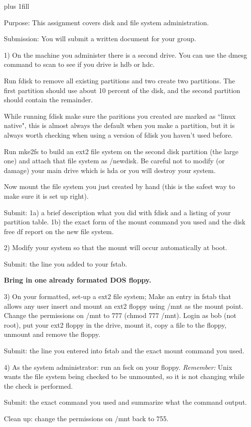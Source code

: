 
\rightskip=0pt plus 1fill

\parindent 0pt

Purpose: This assignment covers disk and file system administration.

Submission: You will submit a written document for your group.

1) On the machine you administer there is a second drive.
You can use the {\ltt{}dmesg} command to scan to see
if you drive is {\ltt{}hdb} or {\ltt{}hdc}.

Run {\ltt{}fdisk} to remove all existing partitions and two create
two partitions.
The first partition should use about 10 percent of the
disk, and the second partition should contain the remainder.

While running {\ltt{}fdisk} make sure the paritions
you created are marked as ``linux native", this is almost always the
default when you make a partition, but it is always worth checking
when using a version of {\ltt{}fdisk} you haven't used before.

Run {\ltt{}mke2fs} to build 
an ext2 file system on the second disk partition (the large
one) and attach that file system as {\ltt{}/newdisk}.
Be careful not to modify (or damage) your main drive
which is {\ltt{}hda} or you will destroy your system.

Now mount the file system you just created by hand
(this is the safest way to make sure it is set up right).

Submit: 
1a) a brief description what you did with {\ltt{}fdisk} and
a listing of your partition table.
1b) the exact form of the {\ltt{}mount} command you used and
the disk free {\ltt{}df} report on the new file system.

2) Modify your system so that the mount will 
occur automatically at boot.

Submit: the line you added to your {\ltt{}fstab}.

{\bf Bring in one already formated DOS floppy.}

3) On your formatted, set-up a ext2 file system;
Make an entry in {\ltt{}fstab} that allows any user insert and 
mount an ext2 floppy using {\ltt{}/mnt} as the mount point.
Change the permissions on {\ltt{}/mnt} to 777 ({\ltt{}chmod 777 /mnt}).
Login as bob (not root), put your ext2 floppy
in the drive,
mount it, copy a file to the floppy, unmount and remove the floppy.

Submit: the line you entered into {\ltt{}fstab} and
the exact mount command you used.

4) As the system administrator: run an {\ltt{}fsck} on your floppy. 
{\it Remember:} Unix wants the file system being checked to be unmounted,
so it is not changing while the check is performed.

Submit: the exact command you used and summarize what the command output.

Clean up: change the permissions on {\ltt{}/mnt} back to 755.

\bye
